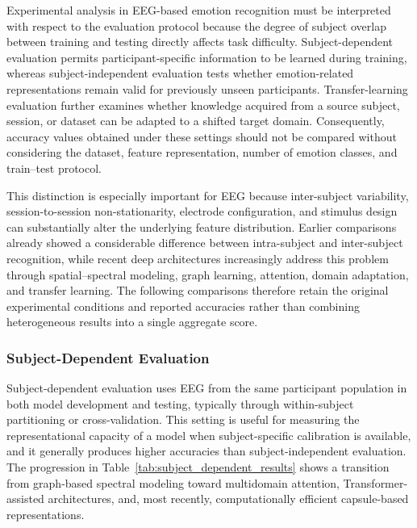 \documentclass{WileyMSP-template}
\begin{document}
Experimental analysis in EEG-based emotion recognition must be interpreted with respect to the evaluation protocol because the degree of subject overlap between training and testing directly affects task difficulty. Subject-dependent evaluation permits participant-specific information to be learned during training, whereas subject-independent evaluation tests whether emotion-related representations remain valid for previously unseen participants. Transfer-learning evaluation further examines whether knowledge acquired from a source subject, session, or dataset can be adapted to a shifted target domain. Consequently, accuracy values obtained under these settings should not be compared without considering the dataset, feature representation, number of emotion classes, and train--test protocol.

This distinction is especially important for EEG because inter-subject variability, session-to-session non-stationarity, electrode configuration, and stimulus design can substantially alter the underlying feature distribution. Earlier comparisons already showed a considerable difference between intra-subject and inter-subject recognition, while recent deep architectures increasingly address this problem through spatial--spectral modeling, graph learning, attention, domain adaptation, and transfer learning. The following comparisons therefore retain the original experimental conditions and reported accuracies rather than combining heterogeneous results into a single aggregate score.


\subsubsection{Subject-Dependent Evaluation}
\label{subsubsec:subject_dependent_evaluation}

Subject-dependent evaluation uses EEG from the same participant population in both model development and testing, typically through within-subject partitioning or cross-validation. This setting is useful for measuring the representational capacity of a model when subject-specific calibration is available, and it generally produces higher accuracies than subject-independent evaluation. The progression in Table~\ref{tab:subject_dependent_results} shows a transition from graph-based spectral modeling toward multidomain attention, Transformer-assisted architectures, and, most recently, computationally efficient capsule-based representations.
\end{document}
